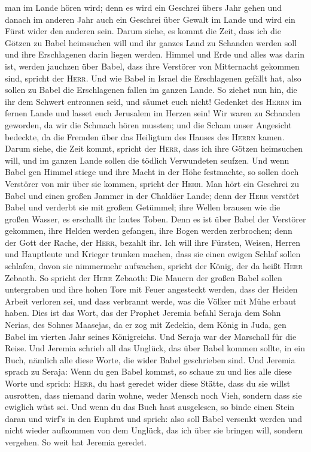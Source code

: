 man im Lande hören wird; denn es wird ein Geschrei übers Jahr gehen und
danach im anderen Jahr auch ein Geschrei über Gewalt im Lande und wird
ein Fürst wider den anderen sein.  Darum siehe, es kommt
die Zeit, dass ich die Götzen zu Babel heimsuchen will und ihr ganzes
Land zu Schanden werden soll und ihre Erschlagenen darin liegen werden.
 Himmel und Erde und alles was darin ist, werden jauchzen
über Babel, dass ihre Verstörer von Mitternacht gekommen sind, spricht
der \textsc{Herr}.  Und wie Babel in Israel die
Erschlagenen gefällt hat, also sollen zu Babel die Erschlagenen fallen
im ganzen Lande.  So ziehet nun hin, die ihr dem Schwert
entronnen seid, und säumet euch nicht! Gedenket des \textsc{Herrn} im
fernen Lande und lasset euch Jerusalem im Herzen sein! 
Wir waren zu Schanden geworden, da wir die Schmach hören mussten; und
die Scham unser Angesicht bedeckte, da die Fremden über das Heiligtum
des Hauses des \textsc{Herrn} kamen.  Darum siehe, die
Zeit kommt, spricht der \textsc{Herr}, dass ich ihre Götzen heimsuchen
will, und im ganzen Lande sollen die tödlich Verwundeten seufzen.
 Und wenn Babel gen Himmel stiege und ihre Macht in der
Höhe festmachte, so sollen doch Verstörer von mir über sie kommen,
spricht der \textsc{Herr}.  Man hört ein Geschrei zu
Babel und einen großen Jammer in der Chaldäer Lande; 
denn der \textsc{Herr} verstört Babel und verderbt sie mit großem
Getümmel; ihre Wellen brausen wie die großen Wasser, es erschallt ihr
lautes Toben.  Denn es ist über Babel der Verstörer
gekommen, ihre Helden werden gefangen, ihre Bogen werden zerbrochen;
denn der Gott der Rache, der \textsc{Herr}, bezahlt ihr. 
Ich will ihre Fürsten, Weisen, Herren und Hauptleute und Krieger trunken
machen, dass sie einen ewigen Schlaf sollen schlafen, davon sie
nimmermehr aufwachen, spricht der König, der da heißt \textsc{Herr}
Zebaoth.  So spricht der \textsc{Herr} Zebaoth: Die
Mauern der großen Babel sollen untergraben und ihre hohen Tore mit Feuer
angesteckt werden, dass der Heiden Arbeit verloren sei, und dass
verbrannt werde, was die Völker mit Mühe erbaut haben. 
Dies ist das Wort, das der Prophet Jeremia befahl Seraja dem Sohn
Nerias, des Sohnes Maasejas, da er zog mit Zedekia, dem König in Juda,
gen Babel im vierten Jahr seines Königreichs. Und Seraja war der
Marschall für die Reise.  Und Jeremia schrieb all das
Unglück, das über Babel kommen sollte, in ein Buch, nämlich alle diese
Worte, die wider Babel geschrieben sind.  Und Jeremia
sprach zu Seraja: Wenn du gen Babel kommst, so schaue zu und lies alle
diese Worte  und sprich: \textsc{Herr}, du hast geredet
wider diese Stätte, dass du sie willst ausrotten, dass niemand darin
wohne, weder Mensch noch Vieh, sondern dass sie ewiglich wüst sei.
 Und wenn du das Buch hast ausgelesen, so binde einen
Stein daran und wirf's in den Euphrat  und sprich: also
soll Babel versenkt werden und nicht wieder aufkommen von dem Unglück,
das ich über sie bringen will, sondern vergehen. So weit hat Jeremia
geredet.

